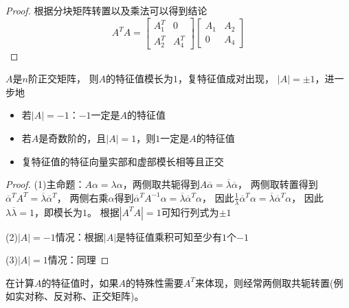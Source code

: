\begin{proof}
  根据分块矩阵转置以及乘法可以得到结论
  \begin{equation*}
    A^TA = \left[
      \begin{array}{cc}
        A_1^T&0\\
        A_2^T&A_4^T
      \end{array}
    \right] \left[
      \begin{array}{cc}
        A_1&A_2\\
        0&A_4
      \end{array}
    \right]
  \end{equation*}
\end{proof}

\begin{theorem}[正交矩阵的行列式与特征值]
  $A$是$n$阶正交矩阵，
  则$A$的特征值模长为$1$，复特征值成对出现，
  $|A| = \pm 1$，进一步地
  \begin{itemize}
  \item 若$|A| = -1$：$-1$一定是$A$的特征值
  \item 若$A$是奇数阶的，且$|A| = 1$，则$1$一定是$A$的特征值
  \item 复特征值的特征向量实部和虚部模长相等且正交
  \end{itemize}
\end{theorem}

\begin{proof}
  (1)主命题：$A\alpha = \lambda \alpha$，两侧取共轭得到$A\overline{\alpha} = \overline{\lambda} \overline{\alpha}$，
  两侧取转置得到$\overline{\alpha}^T A^T = \overline{\lambda} \overline{\alpha}^T $，
  两侧右乘$\alpha$得到$\overline{\alpha}^T A^{-1}\alpha = \overline{\lambda} \overline{\alpha}^T \alpha$，
  因此$\frac{1}{\lambda}\overline{\alpha}^T \alpha = \overline{\lambda} \overline{\alpha}^T \alpha$，
  因此$\lambda \overline{\lambda} = 1$，即模长为$1$。
  根据$|A^TA| = 1$可知行列式为$\pm 1$

  (2)$|A| = -1$情况：根据$|A|$是特征值乘积可知至少有$1$个$-1$

  (3)$|A| = 1$情况：同理
\end{proof}

\begin{note}
  在计算$A$的特征值时，如果$A$的特殊性需要$A^T$来体现，则经常两侧取共轭转置(例如实对称、反对称、正交矩阵)。
\end{note}

